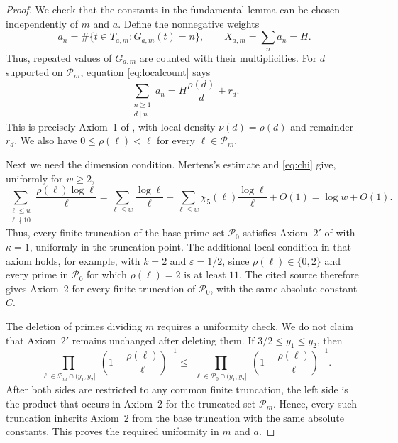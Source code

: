 \documentclass[11pt]{amsart}
\theoremstyle{definition}
\theoremstyle{remark}
\begin{document}
\begin{proof}
We check that the constants in the fundamental lemma can be chosen
independently of $m$ and $a$.
Define the nonnegative weights
  \[
  a_n=\#\{t\in T_{a,m}:G_{a,m}(t)=n\},
  \qquad X_{a,m}=\sum_n a_n=H.
  \]
Thus, repeated values of $G_{a,m}$ are counted with their multiplicities.
For $d$ supported on $\mathcal P_m$, equation \eqref{eq:localcount} says
\[
\sum_{\substack{n\geq1\\d\mid n}}a_n
=H\frac{\rho(d)}d+r_d.
\]
This is precisely Axiom~1 of \cite[pp.~185--186]{Koukoulopoulos}, with local
density $\nu(d)=\rho(d)$ and remainder $r_d$.  We also have
$0\leq\rho(\ell)<\ell$ for every $\ell\in\mathcal P_m$.

Next we need the dimension condition.  Mertens's estimate and
\eqref{eq:chi} give, uniformly for $w\geq2$,
  \begin{equation}\label{eq:weightedrho}
  \sum_{\substack{\ell\leq w\\ \ell\nmid10}}
  \frac{\rho(\ell)\log\ell}{\ell}
  =\sum_{\ell\leq w}\frac{\log\ell}{\ell}
   +\sum_{\ell\leq w}\chi_5(\ell)\frac{\log\ell}{\ell}
   +O(1)
  =\log w+O(1).
  \end{equation}
Thus, every finite truncation of the base prime set $\mathcal P_0$ satisfies
Axiom~$2'$ of \cite[p.~188]{Koukoulopoulos} with $\kappa=1$, uniformly in
the truncation point.  The additional local condition in that axiom holds,
for example, with $k=2$ and $\varepsilon=1/2$, since
$\rho(\ell)\in\{0,2\}$ and every prime in $\mathcal P_0$ for which
$\rho(\ell)=2$ is at least $11$.  The cited source therefore gives Axiom~2
for every finite truncation of $\mathcal P_0$, with the same absolute
constant $C$.

The deletion of primes dividing $m$ requires a uniformity check.  We do not
claim that Axiom~$2'$ remains unchanged after deleting them.  If
$3/2\leq y_1\leq y_2$, then
\[
\prod_{\substack{\ell\in\mathcal P_m\cap(y_1,y_2]}}
\left(1-\frac{\rho(\ell)}\ell\right)^{-1}
\leq
\prod_{\substack{\ell\in\mathcal P_0\cap(y_1,y_2]}}
\left(1-\frac{\rho(\ell)}\ell\right)^{-1}.
\]
After both sides are restricted to any common finite truncation, the left
side is the product that occurs in Axiom~2 for the truncated set
$\mathcal P_m$.  Hence, every such truncation inherits Axiom~2 from the base
truncation with the same absolute constants.  This proves the required
uniformity in $m$ and $a$.


\end{proof}
\end{document}
